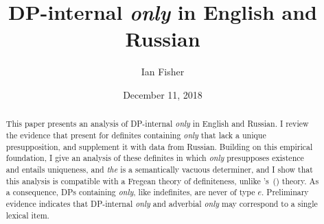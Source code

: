 \documentclass{article}
\title{DP-internal \textit{only} in English and Russian}
\author{Ian Fisher}
\date{December 11, 2018}
\newcommand{\citegen}[1]{\citeauthor{#1}'s~(\citeyear{#1})}
\begin{document}
\maketitle

\begin{abstract}
This paper presents an analysis of DP-internal \textit{only} in English and Russian. I review the evidence that \citet{cb2012b, cb2015} present for definites containing \textit{only} that lack a unique presupposition, and supplement it with data from Russian. Building on this empirical foundation, I give an analysis of these definites in which \textit{only} presupposes existence and entails uniqueness, and \textit{the} is a semantically vacuous determiner, and I show that this analysis is compatible with a Fregean theory of definiteness, unlike \citegen{cb2015} theory. As a consequence, DPs containing \textit{only}, like indefinites, are never of type $e$. Preliminary evidence indicates that DP-internal \textit{only} and adverbial \textit{only} may correspond to a single lexical item.
\end{abstract}












\end{document}
